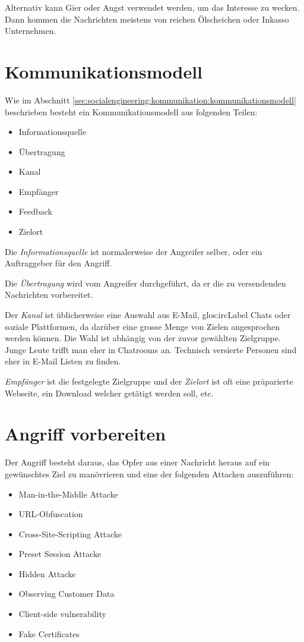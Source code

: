 Alternativ kann Gier oder Angst verwendet werden, um das Interesse zu wecken. Dann kommen die Nachrichten meistens von reichen Ölscheichen oder Inkasso Unternehmen.

\section{Kommunikationsmodell}
Wie im Abschnitt \ref{sec:socialengineering:kommunikation:kommunikationsmodell} beschrieben besteht ein Kommunikationsmodell aus folgenden Teilen:
\begin{itemize}
\item Informationsquelle
\item Übertragung
\item Kanal
\item Empfänger
\item Feedback
\item Zielort
\end{itemize}

Die \textit{Informationsquelle} ist normalerweise der Angreifer selber, oder ein Auftraggeber für den Angriff.

Die \textit{Übertragung} wird vom Angreifer durchgeführt, da er die zu versendenden Nachrichten vorbereitet.

Der \textit{Kanal} ist üblicherweise eine Auswahl aus E-Mail,  \Gls{glos:ircLabel} Chats oder soziale Plattformen, da darüber eine grosse Menge von Zielen angesprochen werden können. Die Wahl ist abhängig von der zuvor gewählten Zielgruppe. Junge Leute trifft man eher in Chatrooms an. Technisch versierte Personen sind eher in E-Mail Listen zu finden.

\textit{Empfänger} ist die festgelegte Zielgruppe und der \textit{Zielort} ist oft eine präparierte Webseite, ein Download welcher getätigt werden soll, etc.

\section{Angriff vorbereiten}
Der Angriff besteht daraus, das Opfer aus einer Nachricht heraus auf ein gewünschtes Ziel zu manövrieren und eine der folgenden Attacken auszuführen:
\begin{itemize}
\item Man-in-the-Middle Attacke
\item URL-Obfuscation
\item Cross-Site-Scripting Attacke
\item Preset Session Attacke
\item Hidden Attacke
\item Observing Customer Data
\item Client-side vulnerability
\item Fake Certificates
\end{itemize}

